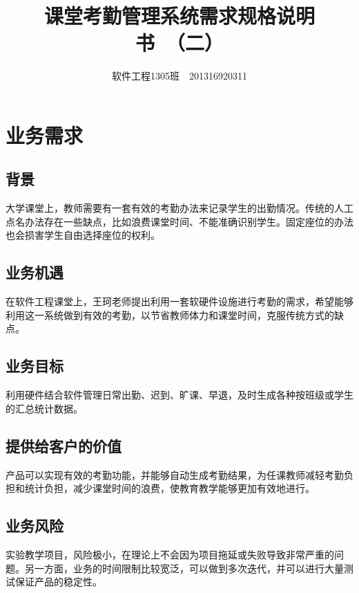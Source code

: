 \documentclass[cs4size,a4paper,nofonts]{ctexart}
\def\tjf{{\tt{田劲锋}}}
\def\titlec{课堂考勤管理系统需求规格说明书}
\def\version{（二）}
\begin{document}

\title{\bf\titlec~\version}
\author{软件工程1305班~\quad\tjf\quad~201316920311}
\maketitle

\section{业务需求}

\subsection{背景}

大学课堂上，教师需要有一套有效的考勤办法来记录学生的出勤情况。传统的人工点名办法存在一些缺点，比如浪费课堂时间、不能准确识别学生。固定座位的办法也会损害学生自由选择座位的权利。

\subsection{业务机遇}

在软件工程课堂上，王珂老师提出利用一套软硬件设施进行考勤的需求，希望能够利用这一系统做到有效的考勤，以节省教师体力和课堂时间，克服传统方式的缺点。

\subsection{业务目标}

利用硬件结合软件管理日常出勤、迟到、旷课、早退，及时生成各种按班级或学生的汇总统计数据。

\subsection{提供给客户的价值}

产品可以实现有效的考勤功能，并能够自动生成考勤结果，为任课教师减轻考勤负担和统计负担，减少课堂时间的浪费，使教育教学能够更加有效地进行。

\subsection{业务风险}

实验教学项目，风险极小，在理论上不会因为项目拖延或失败导致非常严重的问题。另一方面，业务的时间限制比较宽泛，可以做到多次迭代，并可以进行大量测试保证产品的稳定性。
\end{document}
